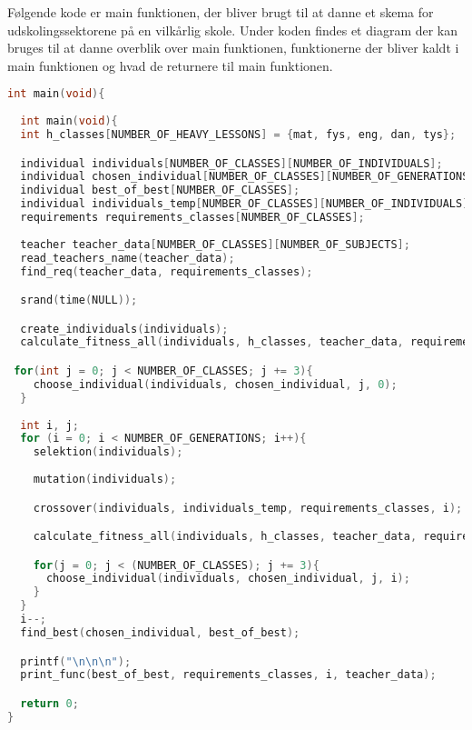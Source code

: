 Følgende kode er main funktionen, der bliver brugt til at danne et skema for udskolingssektorene på en vilkårlig skole. Under koden findes et diagram der kan bruges til at danne overblik over main funktionen, funktionerne der bliver kaldt i main funktionen og hvad de returnere til main funktionen. 
\begin{lstlisting}[showstringspaces=false,language = c]
int main(void){
  
  int main(void){
  int h_classes[NUMBER_OF_HEAVY_LESSONS] = {mat, fys, eng, dan, tys};

  individual individuals[NUMBER_OF_CLASSES][NUMBER_OF_INDIVIDUALS];
  individual chosen_individual[NUMBER_OF_CLASSES][NUMBER_OF_GENERATIONS];
  individual best_of_best[NUMBER_OF_CLASSES];
  individual individuals_temp[NUMBER_OF_CLASSES][NUMBER_OF_INDIVIDUALS];
  requirements requirements_classes[NUMBER_OF_CLASSES];
  
  teacher teacher_data[NUMBER_OF_CLASSES][NUMBER_OF_SUBJECTS];
  read_teachers_name(teacher_data);
  find_req(teacher_data, requirements_classes);

  srand(time(NULL));

  create_individuals(individuals);
  calculate_fitness_all(individuals, h_classes, teacher_data, requirements_classes);

 for(int j = 0; j < NUMBER_OF_CLASSES; j += 3){
    choose_individual(individuals, chosen_individual, j, 0);
  }
 
  int i, j;
  for (i = 0; i < NUMBER_OF_GENERATIONS; i++){
    selektion(individuals);
    
    mutation(individuals);

    crossover(individuals, individuals_temp, requirements_classes, i);

    calculate_fitness_all(individuals, h_classes, teacher_data, requirements_classes);

    for(j = 0; j < (NUMBER_OF_CLASSES); j += 3){
      choose_individual(individuals, chosen_individual, j, i);  
    }
  }
  i--;
  find_best(chosen_individual, best_of_best);

  printf("\n\n\n");
  print_func(best_of_best, requirements_classes, i, teacher_data);

  return 0;
}
\end{lstlisting}

